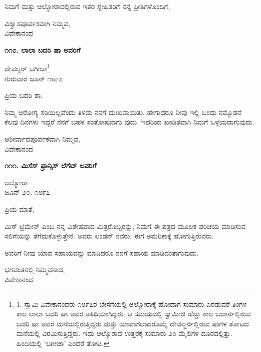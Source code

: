 ನಿಮಗೆ ಮತ್ತು ಆಲ್ಮೋರಾದಲ್ಲಿರುವ ಇತರ ಸ್ನೇಹಿತರಿಗೆ ನನ್ನ ಪ್ರೀತಿಗಳೊಂದಿಗೆ,

\begin{flushright}
ವಿಶ್ವಾಸಪೂರ್ವಕವಾಗಿ ನಿಮ್ಮವ,\\ವಿವೇಕಾನಂದ
\end{flushright}

\begin{center}
\textbf{೧೧೦. ಲಾಲಾ ಬದರಿ ಷಾ ಅವರಿಗೆ}
\end{center}

\begin{flushright}
ದೇವಲ್ಧರ್ ಬಗೀಚಾ\footnote{1. ಸ್ವಾಮಿ ವಿವೇಕಾನಂದರು ೧೮೯೭ರ ಬೇಸಗೆಯಲ್ಲಿ ಆಲ್ಮೋರಾಕ್ಕೆ ಹೋದಾಗ ಸುಮಾರು ಎರಡುವರೆ ತಿಂಗಳ ಕಾಲ ಲಾಲಾ ಬದರಿ ಷಾ ಅವರ ಅತಿಥಿಯಾಗಿದ್ದರು. ಆ ಸಮಯದಲ್ಲಿ ಸ್ವಾಮೀಜಿ ಹೆಚ್ಚು ಕಾಲ ಬಜಾರ್ನಲ್ಲಿರುವ ಬದರಿ ಷಾ ಅವರ ಮನೆಯಲ್ಲಿರುತ್ತಿದ್ದರು ಮತ್ತು ಯಾವಾಗಲಾದರೊಮ್ಮೆ ದೇವಲ್ಧರ್ನಲ್ಲಿರುವ ಷಾಗಳ ತೋಟದ ಮನೆಯಲ್ಲಿ ವಿರಮಿಸುತ್ತಿದ್ದರು. ಇದು ಆಲ್ಮೊರಾದ ಉತ್ತರಕ್ಕೆ ಸುಮಾರು ೨೦ ಮೈಲಿಗಳ ದೂರದಲ್ಲಿತ್ತು. ಹಿಂದಿಯಲ್ಲಿ ‘ಬಗೀಚಾ’ ಎಂದರೆ ತೋಟ.}\\ಗುರುವಾರ ಜೂನ್ ೧೮೯೭
\end{flushright}

ಪ್ರಿಯ ಬದರಿ ಶಾ,

ನಿಮ್ಮ ಆರೋಗ್ಯ ಸರಿಯಿಲ್ಲವೆಂದು ತಿಳಿದು ನನಗೆ ದುಃಖವಾಯಿತು. ಹೇಗಾದರೂ ನೀವು ಇಲ್ಲಿ ಬಂದು ನಮ್ಮೊಡನೆ ಕೆಲವು ದಿನಗಳು ಇದ್ದರೆ ನನಗೆ ಬಹಳ ಸಂತೋಷವಾಗು ವುದು. ಇದರಿಂದ ಖಂಡಿತವಾಗಿ ನಿಮಗೆ ಒಳ್ಳೆಯದಾಗುವುದು.

\begin{flushright}
ಆಶೀರ್ವಾದಪೂರ್ವಕವಾಗಿ ನಿಮ್ಮವ,\\ವಿವೇಕಾನಂದ
\end{flushright}

\begin{center}
\textbf{೧೧೧. ಮಿಸೆಸ್ ಫ್ರಾನ್ಸಿಸ್ ಲೆಗೆಟ್ ಅವರಿಗೆ}
\end{center}

\begin{flushright}
ಆಲ್ಮೋರಾ\\ಜೂನ್ ೨೦, ೧೮೯೭
\end{flushright}

ಪ್ರಿಯ ಮಾತೆ,

ಮಿಸ್ ಟ್ರಿಮೇನ್ ಎಂಬ ನನ್ನ ವಿಶೇಷವಾದ ಮಿತ್ರರೊಬ್ಬರನ್ನು, ನಿಮಗೆ ಈ ಪತ್ರದ ಮೂಲಕ ಪರಿಚಯ ಮಾಡಿಸುವ ಸಲಿಗೆಯನ್ನು ತೆಗೆದುಕೊಳ್ಳುತ್ತೇನೆ. ಅವರು ಲಂಡನ್ ನವರು; ಈಗ ಅಮೆರಿಕಾಕ್ಕೆ ಹೋಗುತ್ತಿರುವರು.

ಅವರಿಗೆ ನೀವು ಯಾವ ಸಹಾಯವನ್ನು ಮಾಡಿದರೂ ನನಗೆ ಸಹಾಯ ಮಾಡಿದಂತಾಗುವುದು.

\begin{flushright}
ಭಗವಂತನಲ್ಲಿ ನಿಮ್ಮವನಾದ,\\ವಿವೇಕಾನಂದ
\end{flushright}


